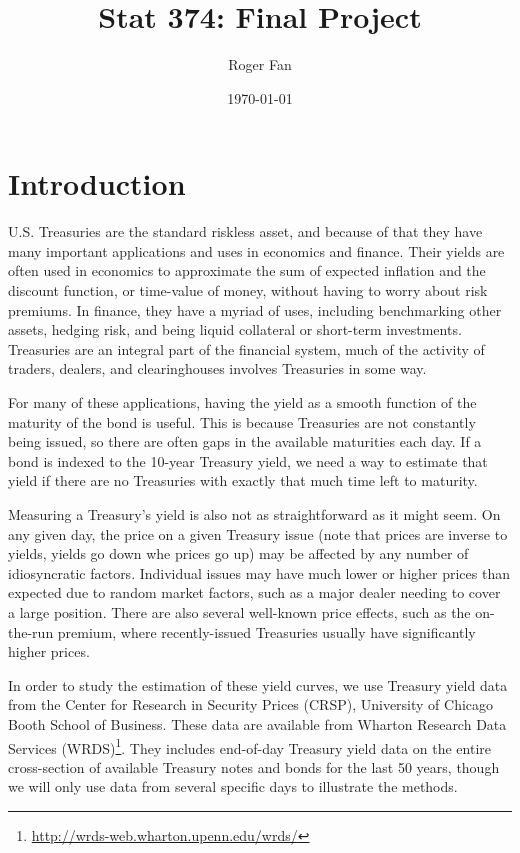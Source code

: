 \documentclass[12pt]{article}
\begin{document}

\title{Stat 374: Final Project}
\author{Roger Fan}
\date{\today}

\maketitle



\section{Introduction}

U.S. Treasuries are the standard riskless asset, and because of that they have many important applications and uses in economics and finance. Their yields are often used in economics to approximate the sum of expected inflation and the discount function, or time-value of money, without having to worry about risk premiums. In finance, they have a myriad of uses, including benchmarking other assets, hedging risk, and being liquid collateral or short-term investments. Treasuries are an integral part of the financial system, much of the activity of traders, dealers, and clearinghouses involves Treasuries in some way.

For many of these applications, having the yield as a smooth function of the maturity of the bond is useful. This is because Treasuries are not constantly being issued, so there are often gaps in the available maturities each day. If a bond is indexed to the 10-year Treasury yield, we need a way to estimate that yield if there are no Treasuries with exactly that much time left to maturity.

Measuring a Treasury's yield is also not as straightforward as it might seem. On any given day, the price on a given Treasury issue (note that prices are inverse to yields, yields go down whe prices go up) may be affected by any number of idiosyncratic factors. Individual issues may have much lower or higher prices than expected due to random market factors, such as a major dealer needing to cover a large position. There are also several well-known price effects, such as the on-the-run premium, where recently-issued Treasuries usually have significantly higher prices.

In order to study the estimation of these yield curves, we use Treasury yield data from the Center for Research in Security Prices (CRSP), University of Chicago Booth School of Business. These data are available from Wharton Research Data Services (WRDS)\footnote{\url{http://wrds-web.wharton.upenn.edu/wrds/}}. They includes end-of-day Treasury yield data on the entire cross-section of available Treasury notes and bonds for the last 50 years, though we will only use data from several specific days to illustrate the methods.
\end{document}
